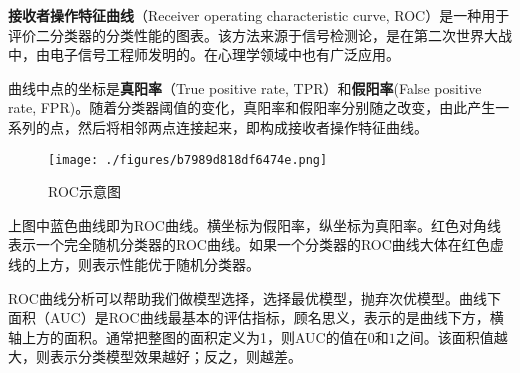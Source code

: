 
\textbf{接收者操作特征曲线}（Receiver operating characteristic curve, ROC）是一种用于评价二分类器的分类性能的图表。该方法来源于信号检测论，是在第二次世界大战中，由电子信号工程师发明的。在心理学领域中也有广泛应用。

曲线中点的坐标是\textbf{真阳率}（True positive rate, TPR）和\textbf{假阳率}(False positive rate, FPR)。随着分类器阈值的变化，真阳率和假阳率分别随之改变，由此产生一系列的点，然后将相邻两点连接起来，即构成接收者操作特征曲线。

\begin{figure}[ht]
\centering
\texttt{[image: ./figures/b7989d818df6474e.png]}
\caption{ROC示意图} \label{fig_ROC_1}
\end{figure}
上图中蓝色曲线即为ROC曲线。横坐标为假阳率，纵坐标为真阳率。红色对角线表示一个完全随机分类器的ROC曲线。如果一个分类器的ROC曲线大体在红色虚线的上方，则表示性能优于随机分类器。

ROC曲线分析可以帮助我们做模型选择，选择最优模型，抛弃次优模型。曲线下面积（AUC）是ROC曲线最基本的评估指标，顾名思义，表示的是曲线下方，横轴上方的面积。通常把整图的面积定义为1，则AUC的值在$0$和$1$之间。该面积值越大，则表示分类模型效果越好；反之，则越差。